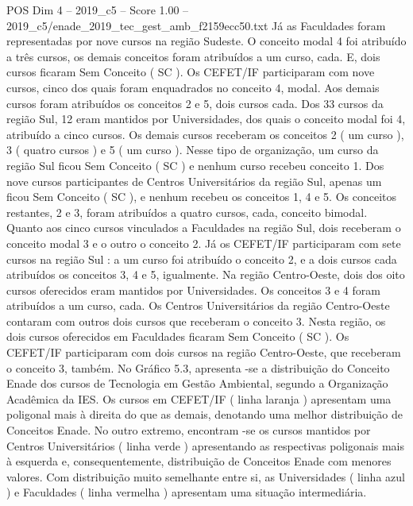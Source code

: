 \begin{textsample}{POS Dim 4 – 2019\_c5 – Score 1.00 – 2019\_c5/enade\_2019\_tec\_gest\_amb\_f2159ecc50.txt}
Já as Faculdades foram representadas por nove cursos na região Sudeste.
O conceito modal 4 foi atribuído a três cursos, os demais conceitos foram atribuídos a um curso, cada.
E, dois cursos ficaram Sem Conceito ( SC ).
Os CEFET/IF participaram com nove cursos, cinco dos quais foram enquadrados no conceito 4, modal.
Aos demais cursos foram atribuídos os conceitos 2 e 5, dois cursos cada.
Dos 33 cursos da região Sul, 12 eram mantidos por Universidades, dos quais o conceito modal foi 4, atribuído a cinco cursos.
Os demais cursos receberam os conceitos 2 ( um curso ), 3 ( quatro cursos ) e 5 ( um curso ).
Nesse tipo de organização, um curso da região Sul ficou Sem Conceito ( SC ) e nenhum curso recebeu conceito 1.
Dos nove cursos participantes de Centros Universitários da região Sul, apenas um ficou Sem Conceito ( SC ), e nenhum recebeu os conceitos 1, 4 e 5.
Os conceitos restantes, 2 e 3, foram atribuídos a quatro cursos, cada, conceito bimodal.
Quanto aos cinco cursos vinculados a Faculdades na região Sul, dois receberam o conceito modal 3 e o outro o conceito 2.
Já os CEFET/IF participaram com sete cursos na região Sul : a um curso foi atribuído o conceito 2, e a dois cursos cada atribuídos os conceitos 3, 4 e 5, igualmente.
Na região Centro-Oeste, dois dos oito cursos oferecidos eram mantidos por Universidades.
Os conceitos 3 e 4 foram atribuídos a um curso, cada.
Os Centros Universitários da região Centro-Oeste contaram com outros dois cursos que receberam o conceito 3.
Nesta região, os dois cursos oferecidos em Faculdades ficaram Sem Conceito ( SC ).
Os CEFET/IF participaram com dois cursos na região Centro-Oeste, que receberam o conceito 3, também.
No Gráfico 5.3, apresenta -se a distribuição do Conceito Enade dos cursos de Tecnologia em Gestão Ambiental, segundo a Organização Acadêmica da IES.
Os cursos em CEFET/IF ( linha laranja ) apresentam uma poligonal mais à direita do que as demais, denotando uma melhor distribuição de Conceitos Enade.
No outro extremo, encontram -se os cursos mantidos por Centros Universitários ( linha verde ) apresentando as respectivas poligonais mais à esquerda e, consequentemente, distribuição de Conceitos Enade com menores valores.
Com distribuição muito semelhante entre si, as Universidades ( linha azul ) e Faculdades ( linha vermelha ) apresentam uma situação intermediária.

\end{textsample}
